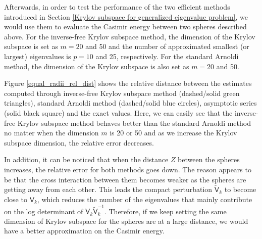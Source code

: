 Afterwards, in order to test the performance of the two efficient methods introduced in Section \ref{Krylov subspace for generalized eigenvalue problem}, we
would use them to evaluate the Casimir energy between two spheres described above. For the inverse-free Krylov subspace method, the dimension of the Krylov subspace is set as $m = 20$ and 50 and the 
number of approximated smallest (or largest) eigenvalues is $p = 10$ and 25, respectively. For the standard Arnoldi method, the dimension of the 
Krylov subspace is also set as $m = 20$ and 50. 

Figure \ref{equal_radii_rel_dist} shows the relative distance between the estimates computed through inverse-free Krylov subspace method 
(dashed/solid green triangles), standard Arnoldi method (dashed/solid blue circles), asymptotic series (solid black square) and the exact values.
Here, we can easily see that the inverse-free Krylov subspace method behaves better than the standard Arnoldi method no matter when the dimension $m$ is 
20 or 50 and as we increase the Krylov subspace dimension, the relative error decreases.

In addition, it can be noticed that when the distance $Z$ between the spheres increases, the relative error 
for both methods goes down. The reason appears to be that the cross interaction between them becomes weaker as the spheres are getting away from each other. 
This leads the compact perturbation $\tilde{\mathsf{V}}_{k}$ to become close to $\mathsf{V}_{k}$, which reduces the number of the eigenvalues that mainly 
contribute on the log determinant of $\mathsf{V}_{k}\tilde{\mathsf{V}}_{k}^{-1}$. Therefore, if we keep setting the same dimension of Krylov subspace 
for the spheres are at a large distance, we would have a better approximation on the Casimir energy.


